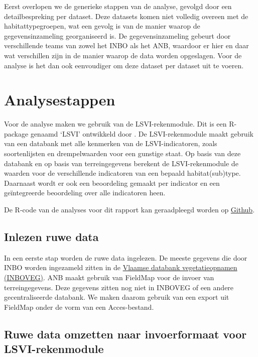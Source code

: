 \documentclass[twoside]{extreport}
\begin{document}
Eerst overlopen we de generieke stappen van de analyse, gevolgd door een
detailbespreking per dataset. Deze datasets komen niet volledig overeen
met de habitattypegroepen, wat een gevolg is van de manier waarop de
gegevensinzameling georganiseerd is. De gegevensinzameling gebeurt door
verschillende teams van zowel het INBO als het ANB, waardoor er hier en
daar wat verschillen zijn in de manier waarop de data worden opgeslagen.
Voor de analyse is het dan ook eenvoudiger om deze dataset per dataset
uit te voeren.

\chapter{Analysestappen}\label{analysestappen}

Voor de analyse maken we gebruik van de LSVI-rekenmodule. Dit is een
R-package genaamd `LSVI' ontwikkeld door \citet{Lommelen2019}. De
LSVI-rekenmodule maakt gebruik van een databank met alle kenmerken van
de LSVI-indicatoren, zoals soortenlijsten en drempelwaarden voor een
gunstige staat. Op basis van deze databank en op basis van
terreingegevens berekent de LSVI-rekenmodule de waarden voor de
verschillende indicatoren van een bepaald habitat(sub)type. Daarnaast
wordt er ook een beoordeling gemaakt per indicator en een geïntegreerde
beoordeling over alle indicatoren heen.

De R-code van de analyses voor dit rapport kan geraadpleegd worden op
\href{https://github.com/ToonHub/RapportageHabitats/}{Github}.

\section{Inlezen ruwe data}\label{inlezen-ruwe-data}

In een eerste stap worden de ruwe data ingelezen. De meeste gegevens die
door INBO worden ingezameld zitten in de
\href{https://inboveg.inbo.be/}{Vlaamse databank vegetatieopnamen
(INBOVEG)}. ANB maakt gebruik van FieldMap voor de invoer van
terreingegevens. Deze gegevens zitten nog niet in INBOVEG of een andere
gecentraliseerde databank. We maken daarom gebruik van een export uit
FieldMap onder de vorm van een Acces-bestand.

\section{Ruwe data omzetten naar invoerformaat voor
LSVI-rekenmodule}\label{h:datainvoer}
\end{document}
